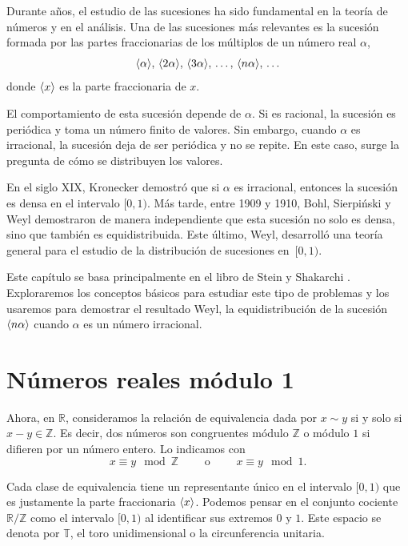 Durante años, el estudio de las sucesiones ha sido fundamental en la teoría de 
números y en el análisis. Una de las sucesiones más relevantes es la sucesión formada
por las partes fraccionarias de los múltiplos de un número real $\alpha$,
\[
  \langle \alpha \rangle, \, \langle 2\alpha \rangle, \, \langle 3\alpha \rangle, \, \ldots, \, \langle n\alpha \rangle, \, \ldots
\]
donde $\langle x \rangle$ es la parte fraccionaria de $x$. 

El comportamiento de esta sucesión depende de $\alpha$. Si es racional, la 
sucesión es periódica y toma un número finito de valores. Sin embargo, cuando 
$\alpha$ es irracional, la sucesión deja de ser periódica y no se repite. 
En este caso, surge la pregunta de cómo se distribuyen los valores. 

En el siglo XIX, Kronecker demostró que si $\alpha$ es irracional, 
entonces la sucesión es densa en el intervalo $[0,1)$. Más tarde, entre 1909 y
1910, Bohl, Sierpiński y Weyl demostraron de manera independiente que esta 
sucesión no solo es densa, sino que también es equidistribuida. Este último,
Weyl, desarrolló una teoría general para el estudio de la distribución de 
sucesiones en~$[0,1)$.

Este capítulo se basa principalmente en el libro de Stein y Shakarchi 
\cite[Capítulo 4, Sección 2]{stein-2003}. Exploraremos los conceptos básicos para estudiar este tipo 
de problemas y los usaremos para demostrar el resultado Weyl, la equidistribución
de la sucesión $\langle n\alpha \rangle$ cuando $\alpha$ es un número irracional. 

\section{Números reales módulo 1}



Ahora, en $\mathbb{R}$, consideramos la relación de equivalencia dada por $x \sim y$ 
si y solo si $x - y \in \mathbb{Z}$. Es decir, dos números son congruentes
módulo $\mathbb{Z}$ o módulo $1$ si difieren por un número entero. Lo indicamos con
\[
    x \equiv y \mod \mathbb{Z} \qquad \text{ o } \qquad x \equiv y \mod 1.
\]

Cada clase de equivalencia tiene un representante único en el intervalo $[0,1)$ que es
justamente la parte fraccionaria $\langle x \rangle$. Podemos pensar en el conjunto cociente 
$\mathbb{R}/\mathbb{Z}$ como el intervalo $[0,1)$ al identificar sus extremos $0$ y $1$.
Este espacio se denota por $\mathbb{T}$, el toro unidimensional o la circunferencia unitaria.

